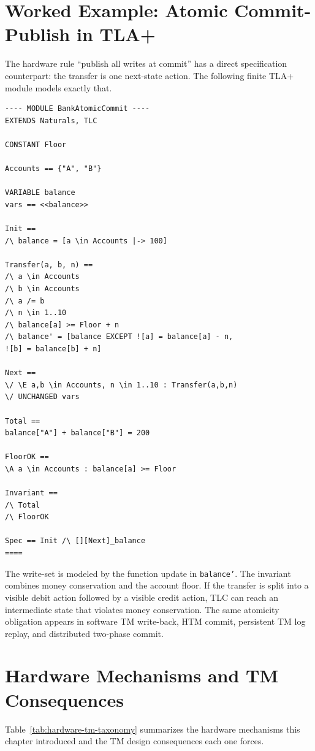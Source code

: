 \section{Worked Example: Atomic Commit-Publish in TLA+}

The hardware rule ``publish all writes at commit'' has a direct specification
counterpart: the transfer is one next-state action. The following finite TLA+
module models exactly that.

\begin{lstlisting}[caption={A finite TLA+ model of atomic bank transfers.},
label={lst:bank-atomic-commit}]
---- MODULE BankAtomicCommit ----
EXTENDS Naturals, TLC

CONSTANT Floor

Accounts == {"A", "B"}

VARIABLE balance
vars == <<balance>>

Init ==
/\ balance = [a \in Accounts |-> 100]

Transfer(a, b, n) ==
/\ a \in Accounts
/\ b \in Accounts
/\ a /= b
/\ n \in 1..10
/\ balance[a] >= Floor + n
/\ balance' = [balance EXCEPT ![a] = balance[a] - n,
![b] = balance[b] + n]

Next ==
\/ \E a,b \in Accounts, n \in 1..10 : Transfer(a,b,n)
\/ UNCHANGED vars

Total ==
balance["A"] + balance["B"] = 200

FloorOK ==
\A a \in Accounts : balance[a] >= Floor

Invariant ==
/\ Total
/\ FloorOK

Spec == Init /\ [][Next]_balance
====
\end{lstlisting}

The write-set is modeled by the function update in \texttt{balance'}.
The invariant combines money conservation and the account floor. If the
transfer is split into a visible debit action followed by a visible credit
action, TLC can reach an intermediate state that violates money conservation.
The same atomicity obligation appears in software TM write-back, HTM commit,
persistent TM log replay, and distributed two-phase commit.

\section{Hardware Mechanisms and TM Consequences}

Table~\ref{tab:hardware-tm-taxonomy} summarizes the hardware mechanisms this
chapter introduced and the TM design consequences each one forces.

